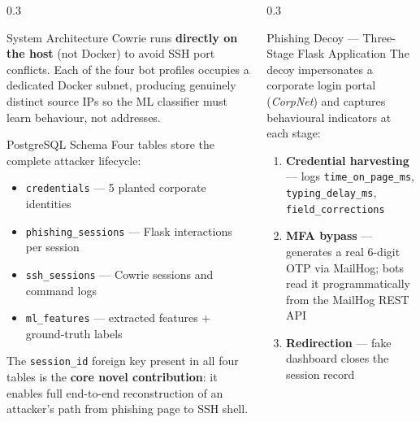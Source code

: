 \documentclass[final]{beamer}
\begin{document}
\begin{frame}[fragile]
\begin{columns}[t]
\begin{column}{0.3\paperwidth}
\begin{block}{System Architecture}
\bigskip
Cowrie runs \textbf{directly on the host} (not Docker) to avoid SSH
port conflicts. Each of the four bot profiles occupies a dedicated
Docker subnet, producing genuinely distinct source IPs so the ML
classifier must learn behaviour, not addresses.
\end{block}

\begin{block}{PostgreSQL Schema}
Four tables store the complete attacker lifecycle:
\begin{itemize}
    \item \texttt{credentials} — 5 planted corporate identities
    \item \texttt{phishing\_sessions} — Flask interactions per session
    \item \texttt{ssh\_sessions} — Cowrie sessions and command logs
    \item \texttt{ml\_features} — extracted features + ground-truth labels
\end{itemize}

\bigskip
The \texttt{session\_id} foreign key present in all four tables is the
\textbf{core novel contribution}: it enables full end-to-end reconstruction
of an attacker's path from phishing page to SSH shell.
\end{block}

\end{column}
\separatorcolumn

\begin{column}{0.3\paperwidth}

\begin{block}{Phishing Decoy — Three-Stage Flask Application}
The decoy impersonates a corporate login portal (\emph{CorpNet}) and
captures behavioural indicators at each stage:

\begin{enumerate}
    \item \textbf{Credential harvesting} — logs \texttt{time\_on\_page\_ms},
          \texttt{typing\_delay\_ms}, \texttt{field\_corrections}
    \item \textbf{MFA bypass} — generates a real 6-digit OTP via MailHog;
          bots read it programmatically from the MailHog REST API
    \item \textbf{Redirection} — fake dashboard closes the session record
\end{enumerate}
\end{block}


\end{column}
\end{columns}
\end{frame}
\end{document}
